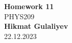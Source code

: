 \begin{titlepage}
    \begin{center}
    {\fontsize{40}{48}\selectfont \bfseries Homework 11} 
    \\\vspace{20pt}
    {\LARGE PHYS209} \\
    \vspace{20pt}
    \textbf{Hikmat Gulaliyev}
    \vspace{8pt}
    \\ 22.12.2023
    \end{center}
\end{titlepage}
